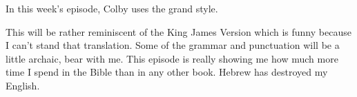 In this week's episode, Colby uses the grand style.

This will be rather reminiscent of the King James Version which is funny because I can't stand that translation. Some of the grammar and punctuation will be a little archaic, bear with me. This episode is really showing me how much more time I spend in the Bible than in any other book. Hebrew has destroyed my English.

